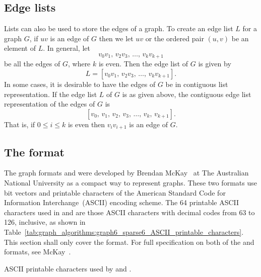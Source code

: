 
\subsection{Edge lists}

Lists can also be used to store the edges of a graph. To create an
edge list $L$ for a graph $G$, if $uv$ is an edge of $G$ then we let
$uv$ or the ordered pair $(u,v)$ be an element of $L$. In general, let
\[
v_0 v_1,\, v_2 v_3,\, \dots,\, v_k v_{k+1}
\]
be all the edges of $G$, where $k$ is even. Then the edge list of $G$
is given by
\[
L
=
[v_0 v_1,\, v_2 v_3,\, \dots,\, v_k v_{k+1}].
\]
In some cases, it is desirable to have the edges of $G$ be in
contiguous list representation. If the
edge list $L$ of $G$ is as given above, the contiguous edge list
representation of the edges of $G$ is
\[
[v_0,\, v_1,\, v_2,\, v_3,\, \dots,\, v_k,\, v_{k+1}].
\]
That is, if $0 \leq i \leq k$ is even then $v_i v_{i+1}$ is an edge of
$G$.



\subsection{The \graphsix format}
\label{sec:graph_algorithms:graph6_format}

The graph formats \graphsix\index{\graphsix} and
\sparsesix\index{\sparsesix} were developed by Brendan
McKay~\cite{McKay2010} at The Australian
National University as a compact
way to represent graphs. These two formats use bit
vectors and printable characters of the American
Standard Code for Information Interchange~(ASCII)
encoding scheme. The 64 printable ASCII characters used in
\graphsix and \sparsesix are those ASCII characters with decimal codes
from 63 to 126, inclusive, as shown in
Table~\ref{tab:graph_algorithms:graph6_sparse6_ASCII_printable_characters}.
This section shall only cover the \graphsix format. For full
specification on both of the \graphsix and \sparsesix formats, see
McKay~\cite{McKay2010}.

\begin{table}[!htbp]
\centering

\caption{ASCII printable characters used by \graphsix and \sparsesix.}
\label{tab:graph_algorithms:graph6_sparse6_ASCII_printable_characters}
\end{table}


